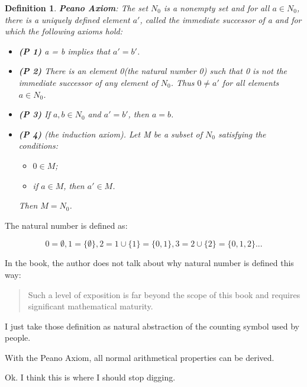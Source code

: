 \documentclass[a4paper]{book}
\newtheorem{definition}{Definition}[section]
\begin{document}
    \begin{definition}
      \textbf{Peano Axiom}: The set $N_0$ is a nonempty set and for all $ a
      \in N_0 $, there is a uniquely defined element $a'$, called the
      immediate successor of a and for which the following axioms hold:
      \begin{itemize}
        \item
          \textbf{(P 1)}  a = b implies that $a' = b'$.
        \item
          \textbf{(P 2)}  There is an element 0(the natural number 0) such
          that 0 is not the immediate successor of any element of $N_0$.
          Thus $0 \neq a'$ for all elements $ a \in N_0 $.
        \item
          \textbf{(P 3)}  If $a,b \in N_0$ and $ a' = b'$, then $a = b$.
        \item
          \textbf{(P 4)}  (the induction axiom). Let M be a subset of $N_0$
          satisfying the conditions:
          \begin{itemize}
            \item $ 0 \in M$;
            \item if $a \in M$, then $a' \in M$.
          \end{itemize}
          Then $ M = N_0 $.
      \end{itemize}
    \end{definition}

    The natural number is defined as\cite{dixon2011algebra}:

    \begin{displaymath}
      0 = \emptyset, 1 = \{\emptyset\}, 2 = 1 \cup \{1\} = \{0, 1\}, 3 = 2 \cup
      \{2\} = \{0, 1, 2\} ...
    \end{displaymath}

    In the book\cite{dixon2011algebra}, the author does not talk about why
    natural number is defined this way:
    \begin{quote}
      Such a level of exposition is far beyond the scope of this book and
      requires significant mathematical maturity.
    \end{quote}

    I just take those definition as natural abstraction of the counting
    symbol used by people.

    With the Peano Axiom, all normal arithmetical properties can be derived.

    Ok. I think this is where I should stop digging.
\end{document}
